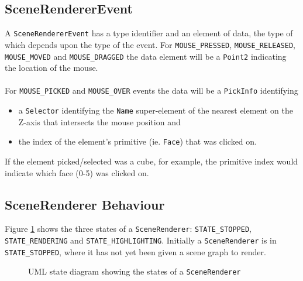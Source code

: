 \documentclass[10pt,aps, prb,preprint]{article}
\begin{document}
\subsection{SceneRendererEvent}
\label{SceneRendererEvent}
A \texttt{SceneRendererEvent} has a type identifier and an element of data, the type of which depends upon the type of the event. For \texttt{MOUSE\_PRESSED}, \texttt{MOUSE\_RELEASED}, \texttt{MOUSE\_MOVED} and \texttt{MOUSE\_DRAGGED} the data element will be a \texttt{Point2} indicating the location of the mouse.
\\
\\
For \texttt{MOUSE\_PICKED} and \texttt{MOUSE\_OVER} events the data will be a \texttt{PickInfo} identifying
\begin{itemize}
\item a \texttt{Selector} identifying the \texttt{Name} super-element of the nearest element on the Z-axis that intersects the mouse position and
\item the index of the element's primitive (ie. \texttt{Face}) that was clicked on.
\end{itemize}
If the element picked/selected was a cube, for example, the primitive index would indicate which face (0-5) was clicked on.

\subsection{SceneRenderer Behaviour}
\label{SceneRendererBehaviour}
Figure \ref{fig:rendererStates} shows the three states of a \texttt{SceneRenderer}: \texttt{STATE\_STOPPED}, \texttt{STATE\_RENDERING} and \texttt{STATE\_HIGHLIGHTING}. Initially a \texttt{SceneRenderer} is in \texttt{STATE\_STOPPED}, where it has not yet been given a scene graph to render.

\begin{figure}[!h]
\label{fig:rendererStates}
\begin{center}
\caption{UML state diagram showing the states of a \texttt{SceneRenderer}}
\end{center}
\end{figure}
\end{document}
